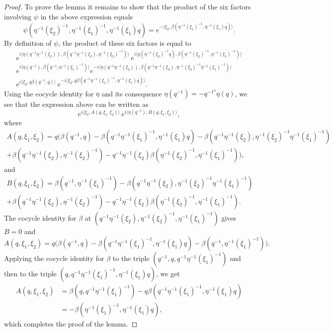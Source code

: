 \documentclass[a4paper,11pt,reqno]{amsart}
\numberwithin{equation}{section}
\theoremstyle{remark}
\theoremstyle{definition}
\begin{document}
\begin{proof}
To prove the lemma it remains to show that the product of the six factors involving $\psi$ in the above expression equals
$$
\overline{\psi(\eta^{-1}(\xi_2)^{-1},\eta^{-1}(\xi_1)^{-1},\eta^{-1}(\xi_1)q)}=e^{-\langle\xi_2,\beta(\eta^{-1}(\xi_1)^{-1},\eta^{-1}(\xi_1)q)\rangle}.
$$
By definition of $\psi$, the product of these six factors is equal to
\begin{multline*}
e^{i\langle\eta(q^{-1}\eta^{-1}(\xi_2)),\beta(q^{-1}\eta^{-1}(\xi_2),\eta^{-1}(\xi_2)^{-1})\rangle}\,
e^{i\langle\eta( \eta^{-1}(\xi_2)^{-1}q),\beta(\eta^{-1}(\xi_2)^{-1},\eta^{-1}(\xi_1)^{-1})\rangle}\\
e^{i\langle\eta(q^{-1}),\beta(q^{-1},\eta^{-1}(\xi_1)^{-1})\rangle}
e^{-i\langle\eta(q^{-1}\eta^{-1}(\xi_2)),\beta(q^{-1}\eta^{-1}(\xi_2),\eta^{-1}(\xi_2)^{-1}\eta^{-1}(\xi_1)^{-1})\rangle}\\
e^{i\langle\xi_2,q\beta(q^{-1},q)\rangle}\,
e^{-i\langle\xi_2,q\beta(q^{-1}\eta^{-1}(\xi_1)^{-1},\eta^{-1}(\xi_1)q)\rangle}.
\end{multline*}
Using the cocycle identity for $\eta$ and its consequence $\eta(q^{-1})=-{q^{-1}}^\flat\eta(q)$, we see that the expression above can be written as
$$
e^{i\langle\xi_2,A(q,\xi_1,\xi_2)\rangle}\,e^{i\langle\eta(q^{-1}),B(q,\xi_1,\xi_2)\rangle},
$$
where
\begin{multline*}
A(q,\xi_1,\xi_2)=q\big(\beta(q^{-1},q)-\beta(q^{-1}\eta^{-1}(\xi_1)^{-1},\eta^{-1}(\xi_1)q)
-\beta(q^{-1}\eta^{-1}(\xi_2),\eta^{-1}(\xi_2)^{-1}\eta^{-1}(\xi_1)^{-1})\\
+\beta(q^{-1}\eta^{-1}(\xi_2),\eta^{-1}(\xi_2)^{-1})- q^{-1}\eta^{-1}(\xi_2)\beta(\eta^{-1}(\xi_2)^{-1},\eta^{-1}(\xi_1)^{-1})\big),
\end{multline*}
and
\begin{multline*}
B(q,\xi_1,\xi_2)=\beta(q^{-1},\eta^{-1}(\xi_1)^{-1})-\beta(q^{-1}\eta^{-1}(\xi_2),\eta^{-1}(\xi_2)^{-1}\eta^{-1}(\xi_1)^{-1})\\
+
\beta(q^{-1}\eta^{-1}(\xi_2),\eta^{-1}(\xi_2)^{-1})-q^{-1}\eta^{-1}(\xi_2)\beta(\eta^{-1}(\xi_2)^{-1},\eta^{-1}(\xi_1)^{-1}).
\end{multline*}
The cocycle identity for $\beta$ at $(q^{-1}\eta^{-1}(\xi_2),\eta^{-1}(\xi_2)^{-1},\eta^{-1}(\xi_1)^{-1})$ gives $B=0$ and
$$
A(q,\xi_1,\xi_2)=q\big(\beta(q^{-1},q)-\beta(q^{-1}\eta^{-1}(\xi_1)^{-1},\eta^{-1}(\xi_1)q)-\beta(q^{-1},\eta^{-1}(\xi_1)^{-1})\big).
$$
Applying the cocycle identity for $\beta$ to the triple $(q^{-1},q,q^{-1}\eta^{-1}(\xi_1)^{-1})$ and then to
the triple $(q,q^{-1}\eta^{-1}(\xi_1)^{-1},\eta^{-1}(\xi_1)q)$, we get
\begin{align*}
A(q,\xi_1,\xi_2)&=\beta(q,q^{-1}\eta^{-1}(\xi_1)^{-1}) -q\beta(q^{-1}\eta^{-1}(\xi_1)^{-1},\eta^{-1}(\xi_1)q)\\
&=-\beta(\eta^{-1}(\xi_1)^{-1},\eta^{-1}(\xi_1)q),
\end{align*}
which completes the proof of the lemma.
\end{proof}
\end{document}
